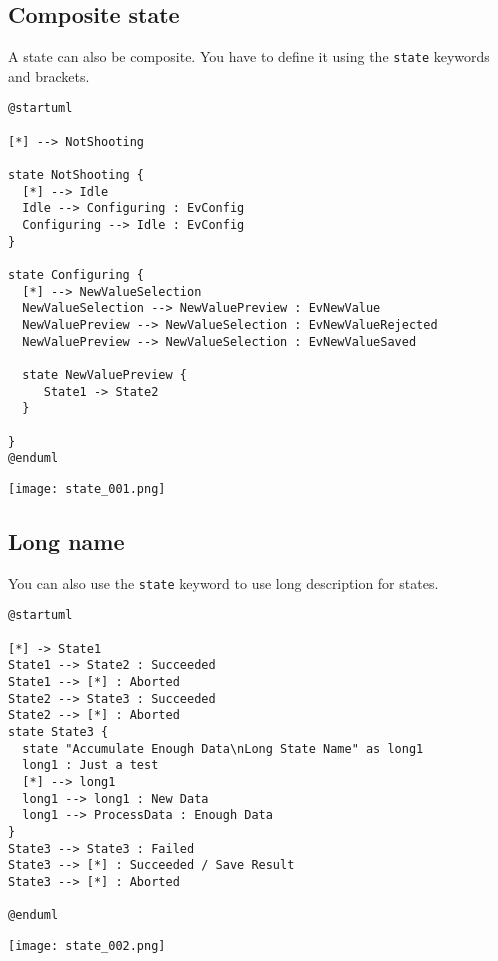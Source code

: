 \newpage \subsection{Composite state}

A state can also be composite. You have to define it using the \texttt{state}
keywords and brackets.


\begin{lstlisting}
@startuml

[*] --> NotShooting

state NotShooting {
  [*] --> Idle
  Idle --> Configuring : EvConfig
  Configuring --> Idle : EvConfig
}

state Configuring {
  [*] --> NewValueSelection
  NewValueSelection --> NewValuePreview : EvNewValue
  NewValuePreview --> NewValueSelection : EvNewValueRejected
  NewValuePreview --> NewValueSelection : EvNewValueSaved
  
  state NewValuePreview {
     State1 -> State2
  }
  
}
@enduml
\end{lstlisting}

\begin{center}
\texttt{[image: state\_001.png]}
\end{center}


\newpage \subsection{Long name}

You can also use the \texttt{state} keyword to use long description for states.

\begin{lstlisting}
@startuml

[*] -> State1
State1 --> State2 : Succeeded
State1 --> [*] : Aborted
State2 --> State3 : Succeeded
State2 --> [*] : Aborted
state State3 {
  state "Accumulate Enough Data\nLong State Name" as long1
  long1 : Just a test
  [*] --> long1
  long1 --> long1 : New Data
  long1 --> ProcessData : Enough Data
}
State3 --> State3 : Failed
State3 --> [*] : Succeeded / Save Result
State3 --> [*] : Aborted
 
@enduml
\end{lstlisting}

\begin{center}
\texttt{[image: state\_002.png]}
\end{center}

